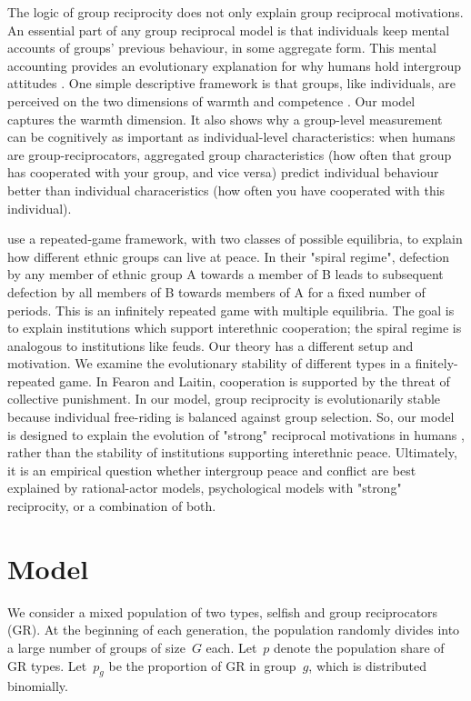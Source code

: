 \documentclass[12pt,a4paper]{article}
\begin{document}
The logic of group reciprocity does not only explain group reciprocal motivations.
An essential part of any group reciprocal model is that individuals keep mental 
accounts of groups' previous behaviour, in some aggregate form. This mental
accounting provides an evolutionary explanation for why humans hold intergroup 
attitudes \parencite{brewer1985psychology,kurzban2001can}. One simple descriptive 
framework is that groups, like individuals, are perceived on the two dimensions of
warmth and competence \parencite{fiske2007universal}. Our model captures
the warmth dimension. It also shows why a group-level measurement can be cognitively
as important as individual-level characteristics: when humans are group-reciprocators,
aggregated group characteristics (how often that group has cooperated
with your group, and vice versa) predict individual behaviour better than individual
characeristics (how often you have cooperated with this individual).

\textcite{fearon1996explaining} use a repeated-game framework, with 
two classes of possible equilibria, to explain how
different ethnic groups can live at peace. In their "spiral regime", defection
by any member of ethnic group A towards a member of B leads to subsequent 
defection by all members of B towards members of A for a fixed number of periods.
This is an infinitely repeated game with multiple equilibria. The goal is to explain
institutions which support interethnic cooperation; the spiral regime is analogous
to institutions like feuds. Our theory has a different setup and motivation. 
We examine the evolutionary stability of different types in a finitely-repeated game. 
In Fearon and Laitin, cooperation is supported by the threat of collective 
punishment. In our model, group reciprocity is evolutionarily stable because 
individual free-riding is balanced against group selection. So, our model
is designed to explain the evolution of "strong" reciprocal
motivations in humans \parencite{gintis2000strong}, rather than the 
stability of institutions supporting interethnic peace. Ultimately, it is an 
empirical question whether intergroup peace and conflict are best explained 
by rational-actor models, psychological models with "strong" reciprocity,
or a combination of both.

\section{Model}

We consider a mixed population of two types, selfish and group reciprocators (GR). At the beginning of each generation, the population randomly divides into a large number of groups of size~$G$ each.
Let~$p$ denote the population share of GR types. 
Let~$p_g$ be the proportion of GR in group~$g$, which is distributed binomially.
\end{document}
